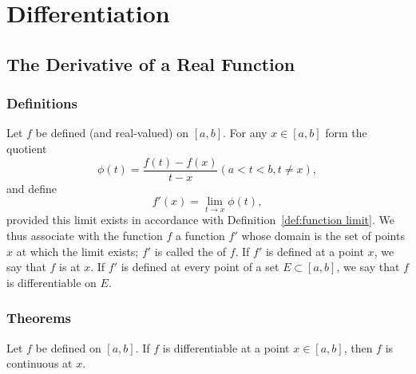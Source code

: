 \chapter{Differentiation}

\section{The Derivative of a Real Function}
\subsection{Definitions}
\begin{definition}
	Let $f$ be defined (and real-valued) on $[a,b]$. For any $x \in [a,b]$ form the quotient $$\phi(t) = \frac{f(t)-f(x)}{t-x} (a<t<b, t \ne x),$$ and define $$f'(x) = \lim_{t \to x} \phi(t),$$ provided this limit exists in accordance with Definition~\ref{def:function limit}. We thus associate with the function $f$ a function $f'$ whose domain is the set of points $x$ at which the limit exists; $f'$ is called the {} of $f$. If $f'$ is defined at a point $x$, we say that $f$ is {} at $x$. If $f'$ is defined at every point of a set $E \subset [a,b]$, we say that $f$ is differentiable on $E$.
\end{definition}

\subsection{Theorems}
\begin{theorem}
	Let $f$ be defined on $[a,b]$. If $f$ is differentiable at a point $x \in [a,b]$, then $f$ is continuous at $x$. 
\end{theorem}



